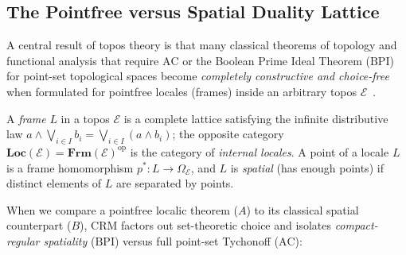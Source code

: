 \subsection{The Pointfree versus Spatial Duality Lattice}

A central result of topos theory is that many classical theorems of topology and functional analysis that require $\mathrm{AC}$ or the Boolean Prime Ideal Theorem ($\mathrm{BPI}$) for point-set topological spaces become \emph{completely constructive and choice-free} when formulated for pointfree locales (frames) inside an arbitrary topos $\mathcal{E}$~\cite{Johnstone82}.

A \emph{frame} $L$ in a topos $\mathcal{E}$ is a complete lattice satisfying the infinite distributive law $a \wedge \bigvee_{i \in I} b_i = \bigvee_{i \in I} (a \wedge b_i)$; the opposite category $\mathbf{Loc}(\mathcal{E}) = \mathbf{Frm}(\mathcal{E})^{\mathrm{op}}$ is the category of \emph{internal locales}. A point of a locale $L$ is a frame homomorphism $p^*: L \to \Omega_{\mathcal{E}}$, and $L$ is \emph{spatial} (has enough points) if distinct elements of $L$ are separated by points.

When we compare a pointfree localic theorem ($A$) to its classical spatial counterpart ($B$), $\mathrm{CRM}$ factors out set-theoretic choice and isolates \emph{compact-regular spatiality} ($\mathrm{BPI}$) versus full point-set Tychonoff ($\mathrm{AC}$):

